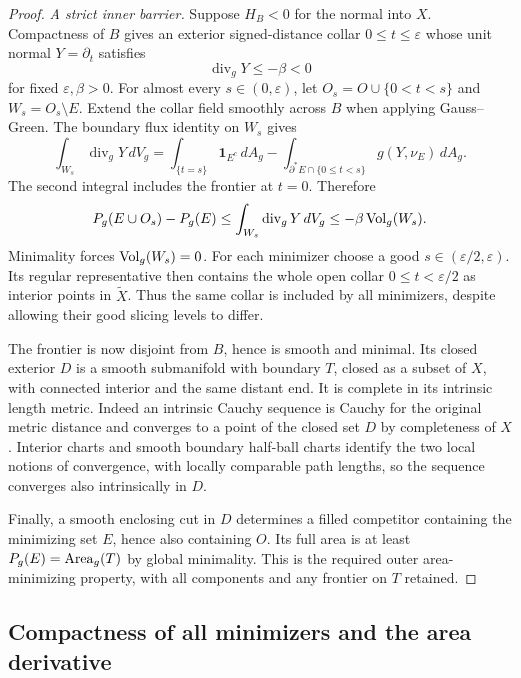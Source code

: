 \begin{proof}
\emph{A strict inner barrier.}
Suppose $H_B<0$ for the normal into $X$. Compactness of $B$ gives an
exterior signed-distance collar $0\le t\le\varepsilon$ whose unit
normal $Y=\partial_t$ satisfies
\[
 \operatorname{div}_gY\le-\beta<0
\]
for fixed $\varepsilon,\beta>0$. For almost every
$s\in(0,\varepsilon)$, let
$O_s=O\cup\{0<t<s\}$ and $W_s=O_s\setminus E$. Extend the collar
field smoothly across $B$ when applying Gauss--Green. The boundary
flux identity on $W_s$ gives
\[
 \int_{W_s}\operatorname{div}_gY\,dV_g
 =\int_{\{t=s\}}\mathbf 1_{E^c}\,dA_g
   -\int_{\partial^*E\cap\{0\le t<s\}}
          g(Y,\nu_E)\,dA_g.
\]
The second integral includes the frontier at $t=0$. Therefore
\begin{equation}
 P_g(E\cup O_s)-P_g(E)
 \le\int_{W_s}\operatorname{div}_gY\,dV_g
 \le-\beta\operatorname{Vol}_g(W_s).
 \label{rig4:enc:inner-truncation}
\end{equation}
Minimality forces $\operatorname{Vol}_g(W_s)=0$. For each minimizer choose a good
$s\in(\varepsilon/2,\varepsilon)$. Its regular representative then
contains the whole open collar $0\le t<\varepsilon/2$ as interior
points in $\widetilde X$. Thus the same collar is included by all
minimizers, despite allowing their good slicing levels to differ.

The frontier is now disjoint from $B$, hence is smooth and minimal.
Its closed exterior $D$ is a smooth submanifold with boundary $T$, closed
as a subset of $X$, with connected interior and the same distant end.
It is complete in its intrinsic length metric. Indeed an intrinsic
Cauchy sequence is Cauchy for the original metric distance and converges
to a point of the closed set $D$ by completeness of $X$. Interior
charts and smooth boundary half-ball charts identify the two local
notions of convergence, with locally comparable path lengths, so the
sequence converges also intrinsically in $D$.

Finally, a smooth enclosing cut in $D$ determines a filled competitor
containing the minimizing set $E$, hence also containing $O$. Its full
area is at least $P_g(E)=\operatorname{Area}_g(T)$ by global minimality. This is the
required outer area-minimizing property, with all components and any
frontier on $T$ retained.
\end{proof}

\subsection{Compactness of all minimizers and the area derivative}
\label{rig4:enc:variation-setup}

